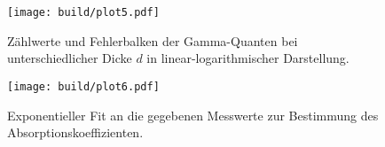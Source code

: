 \begin{figure}[t]
  \centering
  \texttt{[image: build/plot5.pdf]}
  \caption{Zählwerte und Fehlerbalken der Gamma-Quanten bei unterschiedlicher Dicke $d$ in linear-logarithmischer Darstellung.} 
  \label{fig:plot5}
\end{figure}
\clearpage
\begin{figure}[t]
  \centering
  \texttt{[image: build/plot6.pdf]}
  \caption{Exponentieller Fit an die gegebenen Messwerte zur Bestimmung des Absorptionskoeffizienten.} 
  \label{fig:plot6}
\end{figure}
\begin{flushleft}
~
\end{flushleft}